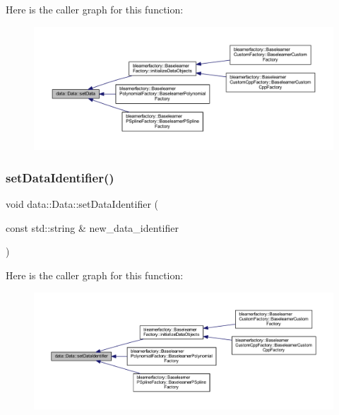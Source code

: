 Here is the caller graph for this function\+:
\nopagebreak
\begin{figure}[H]
\begin{center}
\leavevmode
\includegraphics[width=350pt]{classdata_1_1_data_a0e928c49b31f803e7984cc24e2f73f70_icgraph}
\end{center}
\end{figure}
\mbox{\label{classdata_1_1_data_a62bcea680e1a7d1d4ecec60c111936dc}} 
\subsubsection{\texorpdfstring{set\+Data\+Identifier()}{setDataIdentifier()}}
{\footnotesize\ttfamily void data\+::\+Data\+::set\+Data\+Identifier (\begin{DoxyParamCaption}\item[{const std\+::string \&}]{new\+\_\+data\+\_\+identifier }\end{DoxyParamCaption})}

Here is the caller graph for this function\+:
\nopagebreak
\begin{figure}[H]
\begin{center}
\leavevmode
\includegraphics[width=350pt]{classdata_1_1_data_a62bcea680e1a7d1d4ecec60c111936dc_icgraph}
\end{center}
\end{figure}
\mbox{\label{classdata_1_1_data_a349569c170c7e8b78bf4997b47e3f1a8}} 
